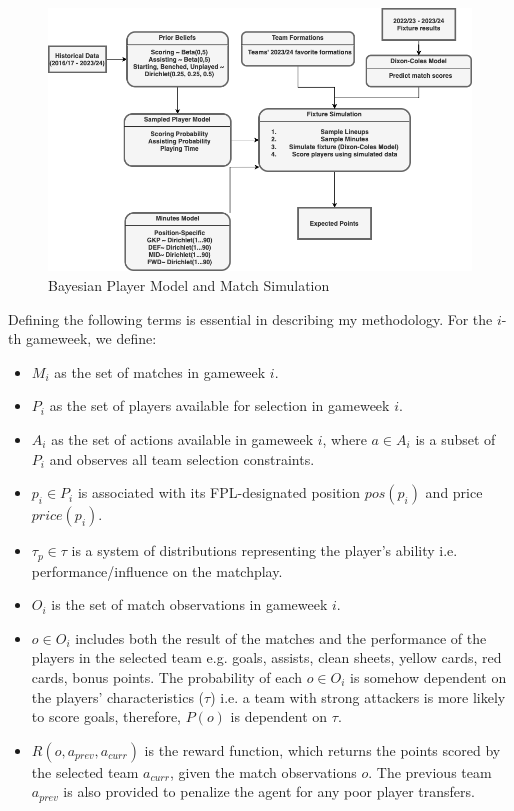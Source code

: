 \begin{figure}[h]
    \centering
    \includegraphics[width=1.2\textwidth]{figs/Bayesian_player_model_Match_simulation.png}
    \vskip 0.2in
    \caption{Bayesian Player Model and Match Simulation}
    \label{fig:bayesian_model_and_simulation}
\end{figure}

Defining the following terms is essential in describing my methodology. For the $i$-th gameweek, we define:
\begin{itemize}
    \item $M_i$ as the set of matches in gameweek $i$.
    \item $P_i$ as the set of players available for selection in gameweek $i$.
    \item $A_i$ as the set of actions available in gameweek $i$, where $a \in A_i$ is a subset of $P_i$ and observes all team selection constraints.
    \item $p_i \in P_i$ is associated with its FPL-designated position $pos(p_i)$ and price $price(p_i)$.
    \item $\tau_p \in \tau$ is a system of distributions representing the player's ability i.e. performance/influence on the matchplay.
    \item $O_i$ is the set of match observations in gameweek $i$.
    \item $o \in O_i$ includes both the result of the matches and the performance of the players in the selected team e.g. goals, assists, clean sheets, yellow cards, red cards, bonus points. The probability of each $o \in O_i$ is somehow dependent on the players' characteristics ($\tau$) i.e. a team with strong attackers is more likely to score goals, therefore, $P(o)$ is dependent on $\tau$.
    \item $R(o, a_{prev}, a_{curr})$ is the reward function, which returns the points scored by the selected team $a_{curr}$, given the match observations $o$. The previous team $a_{prev}$ is also provided to penalize the agent for any poor player transfers.
\end{itemize}


